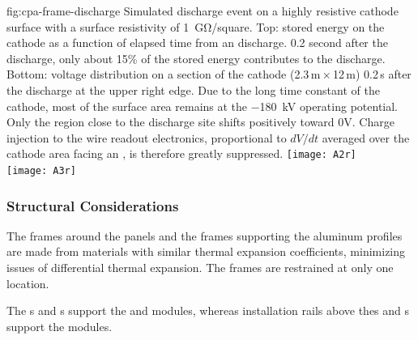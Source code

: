 \begin{dunefigure}
{fig:cpa-frame-discharge}
{Simulated discharge event on a highly resistive cathode surface with a surface resistivity of \SI{1}{\giga\ohm}/square. Top:  stored energy on the cathode as a function of elapsed time from an  discharge. 0.2 second after the discharge, only about 15\% of the stored energy contributes to the discharge. Bottom: voltage distribution on a section of the cathode (2.3\,m\,$\times$\,12\,m) 0.2\,s after the discharge at the upper right edge.  Due to the long time constant of the cathode, most of the surface area remains at the \SI{-180}{\kV} operating potential. Only the region close to the discharge site shifts positively toward 0V. Charge injection to the wire readout electronics, proportional to $dV/dt$ averaged over the cathode area facing an , is therefore greatly suppressed. }
\centering
\texttt{[image: A2r]} \\ \vspace{20pt}    %
\texttt{[image: A3r]}
\end{dunefigure}



\subsubsection{Structural Considerations}

The frames around the  panels and the frames supporting the  aluminum profiles  
are made from materials with similar thermal expansion coefficients, minimizing issues of differential thermal expansion. The  frames 
are restrained at only one location.  

The s and s support the  and  modules, whereas
installation rails above thes and s support the  modules. 

